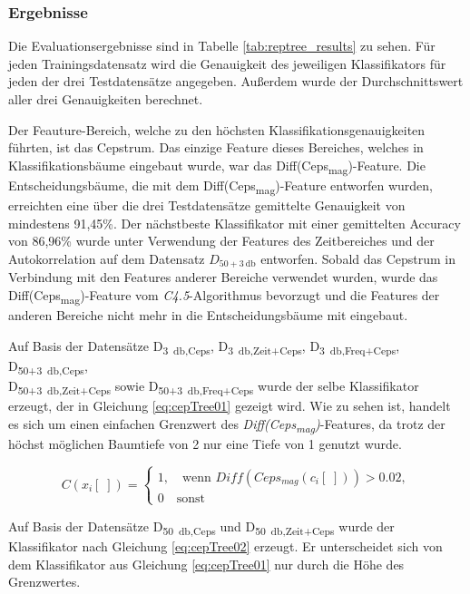 \subsubsection{Ergebnisse}
\label{sec:vad_results}

Die Evaluationsergebnisse sind in Tabelle \ref{tab:reptree_results} zu sehen. Für jeden Trainingsdatensatz wird die Genauigkeit des jeweiligen Klassifikators für jeden der drei Testdatensätze angegeben. Außerdem wurde der Durchschnittswert aller drei Genauigkeiten berechnet.

Der Feauture-Bereich, welche zu den höchsten Klassifikationsgenauigkeiten führten, ist das Cepstrum. Das einzige Feature dieses Bereiches, welches in Klassifikationsbäume eingebaut wurde, war das Diff(Ceps\textsubscript{mag})-Feature. Die Entscheidungsbäume, die mit dem Diff(Ceps\textsubscript{mag})-Feature entworfen wurden, erreichten eine über die drei Testdatensätze gemittelte Genauigkeit von mindestens 91,45\%. Der nächstbeste Klassifikator mit einer gemittelten Accuracy von 86,96\% wurde unter Verwendung der Features des Zeitbereiches und der Autokorrelation auf dem Datensatz $D_{50+\SI{3}{\decibel}}$ entworfen. Sobald das Cepstrum in Verbindung mit den Features anderer Bereiche verwendet wurden, wurde das Diff(Ceps\textsubscript{mag})-Feature vom \emph{C4.5}-Algorithmus bevorzugt und die Features der anderen Bereiche nicht mehr in die Entscheidungsbäume mit eingebaut.

Auf Basis der Datensätze D\textsubscript{\SI{3}{\decibel},Ceps}, D\textsubscript{\SI{3}{\decibel},Zeit+Ceps}, D\textsubscript{\SI{3}{\decibel},Freq+Ceps}, D\textsubscript{50+\SI{3}{\decibel},Ceps}, \\ D\textsubscript{50+\SI{3}{\decibel},Zeit+Ceps} sowie D\textsubscript{50+\SI{3}{\decibel},Freq+Ceps} wurde der selbe Klassifikator erzeugt, der in Gleichung \ref{eq:cepTree01} gezeigt wird. Wie zu sehen ist, handelt es sich um einen einfachen Grenzwert des \emph{Diff(Ceps\textsubscript{mag})}-Features, da trotz der höchst möglichen Baumtiefe von 2 nur eine Tiefe von 1 genutzt wurde.

\begin{equation}
C(x_i[\;]) = \begin{cases}
1, \quad \text{wenn } Diff(Ceps_{mag}(c_i[\;])) > 0.02, \\
0 \quad \text{sonst}
\end{cases}
\label{eq:cepTree01}
\end{equation}


Auf Basis der Datensätze D\textsubscript{\SI{50}{\decibel},Ceps} und D\textsubscript{\SI{50}{\decibel},Zeit+Ceps} wurde der Klassifikator nach Gleichung \ref{eq:cepTree02} erzeugt. Er unterscheidet sich von dem Klassifikator aus Gleichung \ref{eq:cepTree01} nur durch die Höhe des Grenzwertes.

